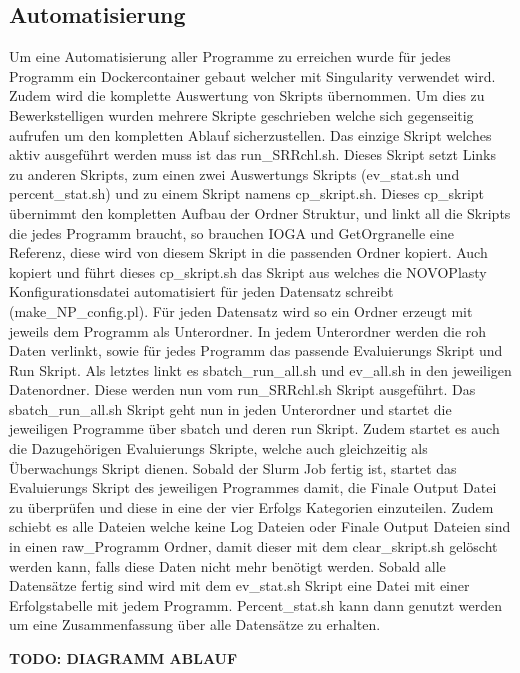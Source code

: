 \documentclass{scrartcl}
\begin{document}
\subsection{Automatisierung}
\label{sec-4-1}
Um eine Automatisierung aller Programme zu erreichen wurde für jedes Programm ein Dockercontainer gebaut welcher mit Singularity verwendet wird. Zudem wird die komplette Auswertung von Skripts 
übernommen. Um dies zu Bewerkstelligen wurden mehrere Skripte geschrieben welche sich gegenseitig aufrufen um den kompletten Ablauf sicherzustellen. 
Das einzige Skript welches aktiv ausgeführt werden muss ist das run\_SRRchl.sh. Dieses Skript setzt Links zu anderen Skripts, zum einen zwei Auswertungs Skripts (ev\_stat.sh und percent\_stat.sh) und
zu einem Skript namens cp\_skript.sh. Dieses cp\_skript übernimmt den kompletten Aufbau der Ordner Struktur, und linkt all die Skripts die jedes Programm braucht, so brauchen IOGA und GetOrgranelle
eine Referenz, diese wird von diesem Skript in die passenden Ordner kopiert. Auch kopiert und führt dieses cp\_skript.sh das Skript aus welches die NOVOPlasty Konfigurationsdatei automatisiert für jeden
Datensatz schreibt (make\_NP\_config.pl). Für jeden Datensatz wird so ein Ordner erzeugt mit jeweils dem Programm als Unterordner. In jedem Unterordner werden die roh Daten verlinkt, sowie für jedes Programm
das passende Evaluierungs Skript und Run Skript. Als letztes linkt es sbatch\_run\_all.sh und ev\_all.sh in den jeweiligen Datenordner. Diese werden nun vom run\_SRRchl.sh Skript ausgeführt. Das sbatch\_run\_all.sh
Skript geht nun in jeden Unterordner und startet die jeweiligen Programme über sbatch und deren run Skript. Zudem startet es auch die Dazugehörigen Evaluierungs Skripte, welche auch gleichzeitig als Überwachungs
Skript dienen. Sobald der Slurm Job fertig ist, startet das Evaluierungs Skript des jeweiligen Programmes damit, die Finale Output Datei zu überprüfen und diese in eine der vier Erfolgs Kategorien einzuteilen. Zudem
schiebt es alle Dateien welche keine Log Dateien oder Finale Output Dateien sind in einen raw\_Programm Ordner, damit dieser mit dem clear\_skript.sh gelöscht werden kann, falls diese Daten nicht mehr benötigt werden.
Sobald alle Datensätze fertig sind wird mit dem ev\_stat.sh Skript eine Datei mit einer Erfolgstabelle mit jedem Programm. Percent\_stat.sh kann dann genutzt werden um eine Zusammenfassung über alle Datensätze zu erhalten.


\textbf{TODO: DIAGRAMM ABLAUF}
\end{document}
